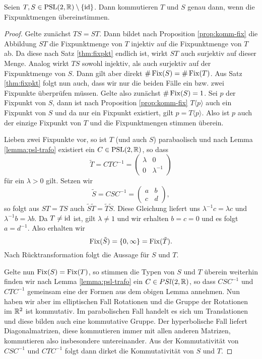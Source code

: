\begin{thm}
  \label{thm:komm-fix}
  Seien $T,S \in \operatorname{PSL}(2, \mathbb{R})\setminus \{\operatorname{id}\}$. Dann kommutieren $T$ und $S$ genau dann,
  wenn die Fixpunktmengen übereinstimmen.
\end{thm}

\begin{proof}
  Gelte zunächst $TS = ST$. Dann bildet nach Proposition
  \ref{prop:komm-fix} die Abbildung $ST$ die Fixpunktmenge von $T$
  injektiv auf die Fixpunktmenge von $T$ ab. Da diese nach Satz
  \ref{thm:fixpkt} endlich ist, wirkt $ST$ auch surjektiv auf dieser
  Menge. Analog wirkt $TS$ sowohl injektiv, als auch surjektiv auf der
  Fixpunktmenge von $S$. Dann gilt aber direkt $\# \operatorname{Fix}(S) = \#
  \operatorname{Fix}(T)$. Aus Satz \ref{thm:fixpkt} folgt nun auch, dass wir nur die
  beiden Fälle ein bzw. zwei Fixpunkte überprüfen müssen. Gelte also
  zunächst $\# \operatorname{Fix}(S) = 1$. Sei $p$ der Fixpunkt von $S$, dann ist
  nach Proposition \ref{prop:komm-fix} $T\langle p \rangle$ auch ein
  Fixpunkt von $S$ und da nur ein Fixpunkt existiert, gilt $ p = T
  \langle p \rangle$. Also ist $p$ auch der einzige Fixpunkt von $T$
  und die Fixpunktmengen stimmen überein.

  Lieben zwei Fixpunkte vor, so ist $T$ (und auch
  $S$) parabaolisch und nach Lemma \ref{lemma:psl-trafo} existiert ein
  $C \in \operatorname{PSL}(2,\mathbb{R})$, so dass
  \[
  \tilde T = C T C^{-1} =
  \begin{pmatrix}
    \lambda & 0 \\
    0 & \lambda^{-1}
  \end{pmatrix}
  \]
  für ein $\lambda > 0$ gilt. Setzen wir
  \[
  \tilde S = C S C^{-1} =
  \begin{pmatrix}
    a & b \\
    c & d
  \end{pmatrix},
  \]
  so folgt aus $ST = TS$ auch $\tilde S \tilde T = \tilde T \tilde
  S$. Diese Gleichung liefert uns $\lambda^{-1} c = \lambda c$ und
  $\lambda^{-1} b = \lambda b$. Da $T \neq \operatorname{id}$ ist, gilt $\lambda \neq 1$ und
  wir erhalten $b = c = 0$ und es folgt $a = d^{-1}$. Also
  erhalten wir
  \[
  \operatorname{Fix}(\tilde S) = \{0, \infty\} = \operatorname{Fix}(\tilde T).
  \]
  Nach Rücktransformation folgt die Aussage für $S$ und $T$.

  Gelte nun $\operatorname{Fix}(S) = \operatorname{Fix}(T)$, so stimmen die Typen von $S$ und $T$
  überein weiterhin finden wir nach Lemma \ref{lemma:psl-trafo} ein $C
  \in PSl(2, \mathbb{R})$, so dass $C S C^{-1}$ und $C T C^{-1}$ gemeinsam
  eine der Formen aus dem obigen Lemma annehmen. Nun haben wir aber im
  elliptischen Fall Rotationen und die Gruppe der Rotationen im $\mathbb{R}^2$
  ist kommutativ. Im parabolischen Fall handelt es sich um
  Translationen und diese bilden auch eine kommutative Gruppe. Der
  hyperbolische Fall liefert Diagonalmatrizen, diese kommutieren immer
  mit allen anderen Matrizen, kommutieren also insbesondere
  untereinander. Aus der Kommutativität von $C S C^{-1}$ und $C T
  C^{-1}$ folgt dann dirket die Kommutativität von $S$ und $T$.
\end{proof}

